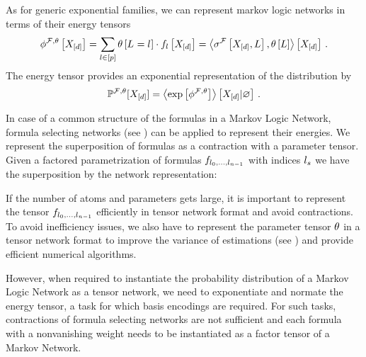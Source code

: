 

As for generic exponential families, we can represent markov logic networks in terms of their energy tensors
\begin{align}
    \phi^{\mathcal{F},\theta}\left[X_{[d]}\right]
    = \sum_{l\in[p]} \theta\left[L_{}=l_{}\right] \cdot f_{l}\left[X_{[d]}\right]
    = \left\langle \sigma^{\mathcal{F}}\left[X_{[d]},L\right],\theta\left[L\right]\right\rangle \left[ X_{[d]} \right] \, .
\end{align}
The energy tensor provides an exponential representation of the distribution by
\begin{align}
    \mathbb{P}^{\mathcal{F},\theta}[X_{[d]}] = \left\langle \mathrm{exp}\left[\phi^{\mathcal{F},\theta}\right]\right\rangle \left[ X_{[d]} | \varnothing \right] \, .
\end{align}

In case of a common structure of the formulas in a Markov Logic Network, formula selecting networks (see ) can be applied to represent their energies.
We represent the superposition of formulas as a contraction with a parameter tensor.
Given a factored parametrization of formulas $f_{l_{0},\ldots,l_{n-1}}$ with indices $l_{s}$ we have the superposition by the network representation:
\begin{center}
    
\end{center}


If the number of atoms and parameters gets large, it is important to represent the tensor ${f_{l_{0},\ldots,l_{n-1}}}$ efficiently in tensor network format and avoid contractions.
To avoid inefficiency issues, we also have to represent the parameter tensor $\theta$ in a tensor network format to improve the variance of estimations (see ) and provide efficient numerical algorithms.

However, when required to instantiate the probability distribution of a Markov Logic Network as a tensor network, we need to exponentiate and normate the energy tensor, a task for which basis encodings are required.
For such tasks, contractions of formula selecting networks are not sufficient and each formula with a nonvanishing weight needs to be instantiated as a factor tensor of a Markov Network.






